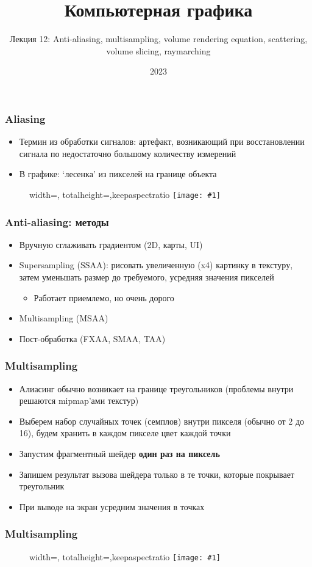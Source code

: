 \documentclass[10pt]{beamer}
\title{Компьютерная графика}
\subtitle{Лекция 12: Anti-aliasing, multisampling, volume rendering equation, scattering, volume slicing, raymarching}
\date{2023}
\newcommand{\slideimage}[1]{
  \begin{figure}
    \begin{adjustbox}{width=\textwidth, totalheight=\textheight-2\baselineskip-2\baselineskip,keepaspectratio}
      \texttt{[image: \#1]}
    \end{adjustbox}
  \end{figure}
}
\begin{document}

\frame{\titlepage}
\begin{frame}[fragile]
\frametitle{Aliasing}
\begin{itemize}
\item Термин из обработки сигналов: артефакт, возникающий при восстановлении сигнала по недостаточно большому количеству измерений
\pause
\item В графике: `лесенка' из пикселей на границе объекта
\end{itemize}
\slideimage{aliasing.png}
\end{frame}

\begin{frame}[fragile]
\frametitle{Anti-aliasing: методы}
\begin{itemize}
\item Вручную сглаживать градиентом (2D, карты, UI)
\pause
\item Supersampling (SSAA): рисовать увеличенную (x4) картинку в текстуру, затем уменьшать размер до требуемого, усредняя значения пикселей
\begin{itemize}
\item Работает приемлемо, но очень дорого
\end{itemize}
\pause
\item Multisampling (MSAA)
\pause
\item Пост-обработка (FXAA, SMAA, TAA)
\end{itemize}
\end{frame}

\begin{frame}[fragile]
\frametitle{Multisampling}
\begin{itemize}
\item Алиасинг обычно возникает на границе треугольников (проблемы внутри решаются mipmap'ами текстур)
\pause
\item Выберем набор случайных точек (семплов) внутри пикселя (обычно от 2 до 16), будем хранить в каждом пикселе цвет каждой точки
\pause
\item Запустим фрагментный шейдер \textbf{один раз на пиксель}
\pause
\item Запишем результат вызова шейдера только в те точки, которые покрывает треугольник
\pause
\item При выводе на экран усредним значения в точках
\end{itemize}
\end{frame}

\begin{frame}[fragile]
\frametitle{Multisampling}
\slideimage{multisampling.png}
\end{frame}
\end{document}
